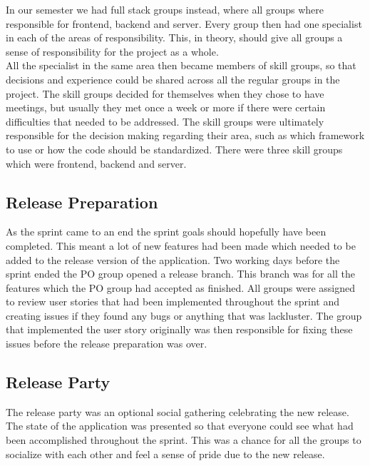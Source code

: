 In our semester we had full stack groups instead, where all groups where responsible for frontend, backend and server. Every group then had one specialist in each of the areas of responsibility.
This, in theory, should give all groups a sense of responsibility for the project as a whole.\\
All the specialist in the same area then became members of skill groups, so that decisions and experience could be shared across all the regular groups in the project.
The skill groups decided for themselves when they chose to have meetings, but usually they met once a week or more if there were certain difficulties that needed to be addressed.
The skill groups were ultimately responsible for the decision making regarding their area, such as which framework to use or how the code should be standardized.
There were three skill groups which were frontend, backend and server.

\subsection{Release Preparation}
As the sprint came to an end the sprint goals should hopefully have been completed.
This meant a lot of new features had been made which needed to be added to the release version of the application.
Two working days before the sprint ended the PO group opened a release branch.
This branch was for all the features which the PO group had accepted as finished.
All groups were assigned to review user stories that had been implemented throughout the sprint and creating issues if they found any bugs or anything that was lackluster.
The group that implemented the user story originally was then responsible for fixing these issues before the release preparation was over.

\subsection{Release Party}
The release party was an optional social gathering celebrating the new release. 
The state of the application was presented so that everyone could see what had been accomplished throughout the sprint.
This was a chance for all the groups to socialize with each other and feel a sense of pride due to the new release.

